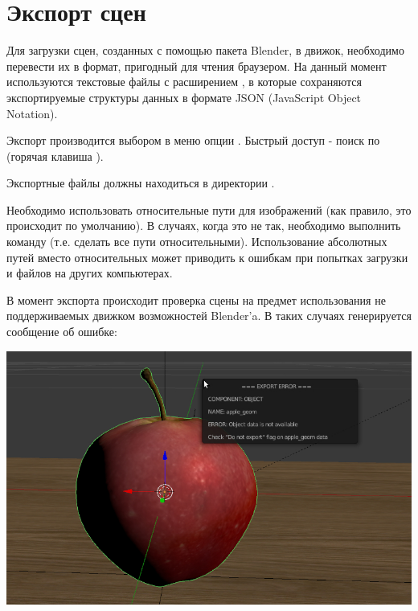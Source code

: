 \documentclass[a4paper,12pt,oneside]{sphinxmanual}
\begin{document}

\section{Экспорт сцен}
\label{working_process_stages:index-0}\label{working_process_stages:id3}
Для загрузки сцен, созданных с помощью пакета Blender, в движок, необходимо перевести их в формат, пригодный для чтения браузером. На данный момент используются текстовые файлы с расширением , в которые сохраняются экспортируемые структуры данных в формате JSON (JavaScript Object Notation).

Экспорт производится выбором в меню  опции . Быстрый доступ - поиск по  (горячая клавиша ).

Экспортные файлы должны находиться в директории .

Необходимо использовать относительные пути для изображений (как правило, это происходит по умолчанию). В случаях, когда это не так, необходимо выполнить команду  (т.е. сделать все пути относительными). Использование абсолютных путей вместо относительных может приводить к ошибкам при попытках загрузки  и  файлов на других компьютерах.

В момент экспорта происходит проверка сцены на предмет использования не поддерживаемых движком возможностей Blender'a. В таких случаях генерируется сообщение об ошибке:

{\hfill\includegraphics[width=1.000\linewidth]{error_message.jpg}\hfill}
\end{document}
